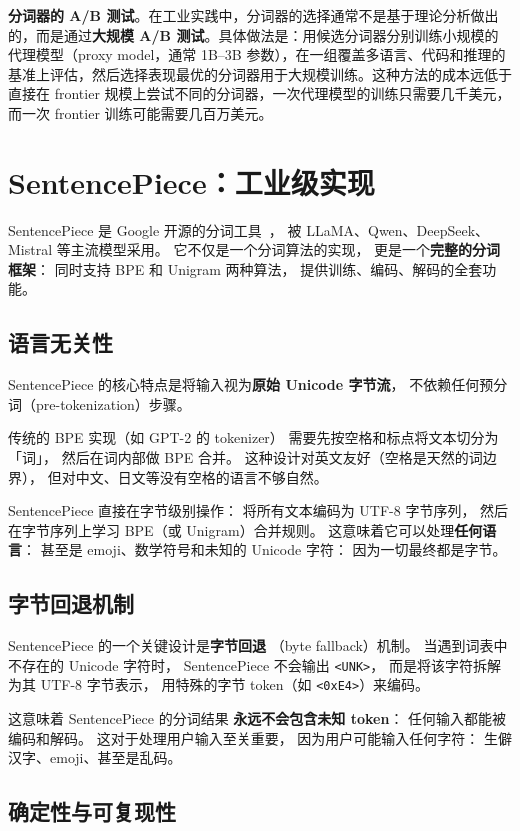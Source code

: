 \textbf{分词器的 A/B 测试}。在工业实践中，分词器的选择通常不是基于理论分析做出的，而是通过\textbf{大规模 A/B 测试}。具体做法是：用候选分词器分别训练小规模的代理模型（proxy model，通常 1B--3B 参数），在一组覆盖多语言、代码和推理的基准上评估，然后选择表现最优的分词器用于大规模训练。这种方法的成本远低于直接在 frontier 规模上尝试不同的分词器，一次代理模型的训练只需要几千美元，而一次 frontier 训练可能需要几百万美元。

\section{SentencePiece：工业级实现}

SentencePiece 是 Google 开源的分词工具~\cite{kudo2018sentencepiece}，
被 LLaMA、Qwen、DeepSeek、Mistral 等主流模型采用。
它不仅是一个分词算法的实现，
更是一个\textbf{完整的分词框架}：
同时支持 BPE 和 Unigram 两种算法，
提供训练、编码、解码的全套功能。

\subsection{语言无关性}

SentencePiece 的核心特点是将输入视为\textbf{原始 Unicode 字节流}，
不依赖任何预分词（pre-tokenization）步骤。

传统的 BPE 实现（如 GPT-2 的 tokenizer）
需要先按空格和标点将文本切分为「词」，
然后在词内部做 BPE 合并。
这种设计对英文友好（空格是天然的词边界），
但对中文、日文等没有空格的语言不够自然。

SentencePiece 直接在字节级别操作：
将所有文本编码为 UTF-8 字节序列，
然后在字节序列上学习 BPE（或 Unigram）合并规则。
这意味着它可以处理\textbf{任何语言}：
甚至是 emoji、数学符号和未知的 Unicode 字符：
因为一切最终都是字节。

\subsection{字节回退机制}

SentencePiece 的一个关键设计是\textbf{字节回退}
（byte fallback）机制。
当遇到词表中不存在的 Unicode 字符时，
SentencePiece 不会输出 \texttt{<UNK>}，
而是将该字符拆解为其 UTF-8 字节表示，
用特殊的字节 token（如 \texttt{<0xE4>}）来编码。

这意味着 SentencePiece 的分词结果
\textbf{永远不会包含未知 token}：
任何输入都能被编码和解码。
这对于处理用户输入至关重要，
因为用户可能输入任何字符：
生僻汉字、emoji、甚至是乱码。

\subsection{确定性与可复现性}

